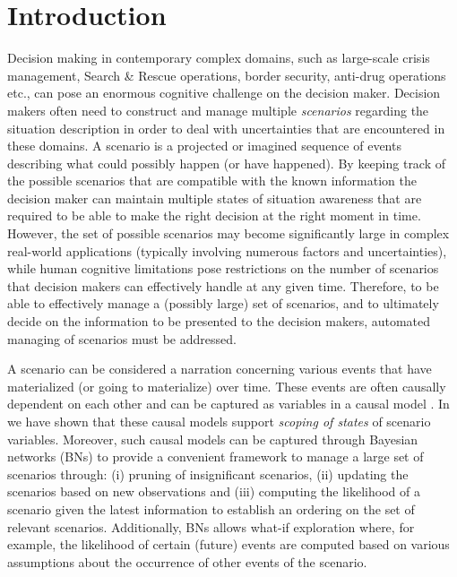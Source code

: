 \documentclass[conference]{IEEEtran}
\begin{document}

\section{Introduction}



Decision making in contemporary complex domains, such as large-scale crisis management, Search \& Rescue operations, border security, anti-drug operations etc., can pose an enormous cognitive challenge on the decision maker. Decision makers often need to construct and manage multiple {\em scenarios} regarding the situation description in order to deal with uncertainties that are encountered in these domains. A scenario is a projected or imagined sequence of events describing what could possibly happen (or have happened). By keeping track of the possible scenarios that are compatible with the known information the decision maker can maintain multiple states of situation awareness that are required to be able to make the right decision at the right moment in time. However, the set of possible scenarios may become significantly large in complex real-world applications (typically involving numerous factors and uncertainties), while human cognitive limitations pose restrictions on the number of scenarios that decision makers can effectively handle at any given time. Therefore, to be able to effectively manage a (possibly large) set of scenarios, and to ultimately decide on the information to be presented to the decision makers, automated managing of scenarios must be addressed.

A scenario can be considered a narration concerning various events that have materialized (or going to materialize) over time. These events are often causally dependent on each other and can be captured as variables in a causal model \cite{pearl00book}. In \cite{conrado14if} we have shown that these causal models support {\em scoping of states} of scenario variables. Moreover, such causal models can be captured through Bayesian networks (BNs) \cite{pearl88book, jensen07book} to provide a convenient framework to manage a large set of scenarios through: (i) pruning of insignificant scenarios, (ii) updating the scenarios based on new observations and (iii) computing the likelihood of a scenario given the latest information to establish an ordering on the set of relevant scenarios. Additionally, BNs allows what-if exploration where, for example, the likelihood of certain (future) events are computed based on various assumptions about the occurrence of other events of the scenario.
\end{document}
